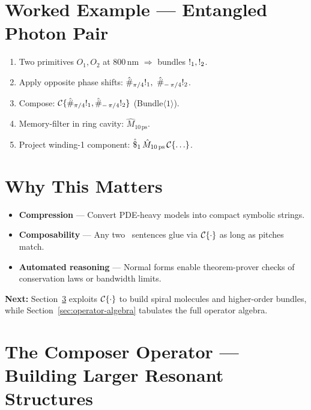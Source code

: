\section{Worked Example — Entangled Photon Pair}

\begin{enumerate}[leftmargin=1.5em]
  \item Two primitives \(O_{1},O_{2}\) at \(800\,\mathrm{nm}\)
        \(\Rightarrow\) bundles \(\mathsf{!}_{1},\mathsf{!}_{2}\).
  \item Apply opposite phase shifts:
        \(\hat{\#}_{\pi/4}\RB{1},\ \hat{\#}_{-\,\pi/4}\RB{2}\).
  \item Compose:
        \(\mathcal{C}\{\hat{\#}_{\pi/4}\mathsf{!}_{1},\hat{\#}_{-\,\pi/4}\mathsf{!}_{2}\}\)
        (Bundle\(\langle 1\rangle\)).
  \item Memory-filter in ring cavity:
        \(\hat{M}_{10\,\mathrm{ps}}\).
  \item Project winding-1 component:
        \(\hat{\$}_{1}\,\hat{M}_{10\,\mathrm{ps}}\,\mathcal{C}\{\ldots\}\).
\end{enumerate}

\section{Why This Matters}

\begin{itemize}[leftmargin=1.5em]
  \item \textbf{Compression} — Convert PDE-heavy models into compact symbolic strings.
  \item \textbf{Composability} — Any two \RCM\ sentences glue via \(\mathcal{C}\{\cdot\}\) as long as pitches match.
  \item \textbf{Automated reasoning} — Normal forms enable theorem-prover checks of conservation laws or bandwidth limits.
\end{itemize}

\bigskip
\textbf{Next:} Section~\ref{sec:composer-operator} exploits \(\mathcal{C}\{\cdot\}\) to build spiral molecules
and higher-order bundles, while Section~\ref{sec:operator-algebra} tabulates the full operator algebra.

\section{The Composer Operator — Building Larger Resonant Structures}
\label{sec:composer-operator}

